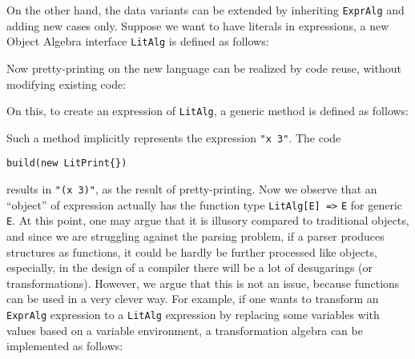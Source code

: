 
On the other hand, the data variants can be extended by inheriting \lstinline{ExprAlg} and adding new cases only. Suppose we want to
have literals in expressions, a new Object Algebra interface \lstinline{LitAlg} is defined as follows:


Now pretty-printing on the new language can be realized by code reuse, without modifying existing code:


On this, to create an expression of \lstinline{LitAlg}, a generic method is defined as follows:


Such a method implicitly represents the expression \lstinline{"x 3"}. The code

\begin{lstlisting}
build(new LitPrint{})
\end{lstlisting}

results in \lstinline{"(x 3)"}, as the result of pretty-printing. Now we observe that an ``object'' of expression actually
has the function type \lstinline{LitAlg[E] =>} \lstinline{E} for generic \lstinline{E}. At this point, one may argue
that it is illusory compared to traditional objects, and since we are struggling against the parsing problem, if a parser
produces structures as functions, it could be hardly be further processed like objects, especially, in the design of a compiler
there will be a lot of desugarings (or transformations). However, we argue that this is not an issue, because functions can be used
in a very clever way. For example, if one wants to transform an \lstinline{ExprAlg} expression to a \lstinline{LitAlg} expression by
replacing some variables with values based on a variable environment, a transformation algebra can be implemented as follows:


